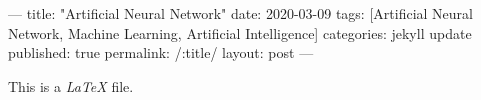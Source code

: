 ---
title: "Artificial Neural Network"
date: 2020-03-09
tags: [Artificial Neural Network, Machine Learning, Artificial Intelligence]
categories: jekyll update
published: true
permalink: /:title/
layout: post
---

This is a \emph{LaTeX} file.

